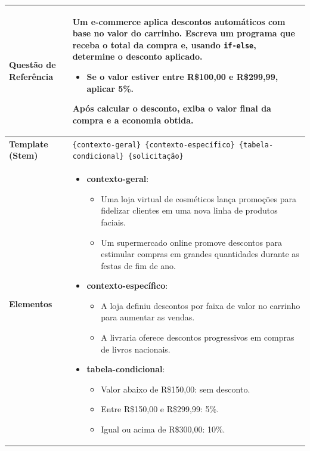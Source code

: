\begin{table}[htbp]
\centering
\begin{tabular}{|l|p{10cm}|}
\hline
\textbf{Questão de Referência} 
& Um e-commerce aplica descontos automáticos com base no valor do carrinho. Escreva um programa que receba o total da compra e, usando \texttt{if-else}, determine o desconto aplicado.  
\begin{itemize}
    \item Se o valor estiver entre R\$100,00 e R\$299,99, aplicar 5\%.
\end{itemize}
Após calcular o desconto, exiba o valor final da compra e a economia obtida. \\
\hline

\textbf{Template (Stem)} 
& \texttt{\{contexto-geral\} \{contexto-específico\} \{tabela-condicional\} \{solicitação\}} \\
\hline

\textbf{Elementos} 
& 
\begin{itemize}[leftmargin=1em]
  \item \textbf{contexto-geral}:
    \begin{itemize}[leftmargin=1em]
      \item Uma loja virtual de cosméticos lança promoções para fidelizar clientes em uma nova linha de produtos faciais.
      \item Um supermercado online promove descontos para estimular compras em grandes quantidades durante as festas de fim de ano.
    \end{itemize}

  \item \textbf{contexto-específico}:
    \begin{itemize}[leftmargin=1em]
      \item A loja definiu descontos por faixa de valor no carrinho para aumentar as vendas.
      \item A livraria oferece descontos progressivos em compras de livros nacionais.
    \end{itemize}

  \item \textbf{tabela-condicional}:
    \begin{itemize}[leftmargin=1em]
      \item Valor abaixo de R\$150,00: sem desconto.
      \item Entre R\$150,00 e R\$299,99: 5\%.
      \item Igual ou acima de R\$300,00: 10\%.
    \end{itemize}


\end{itemize}
\end{tabular}
\end{table}
